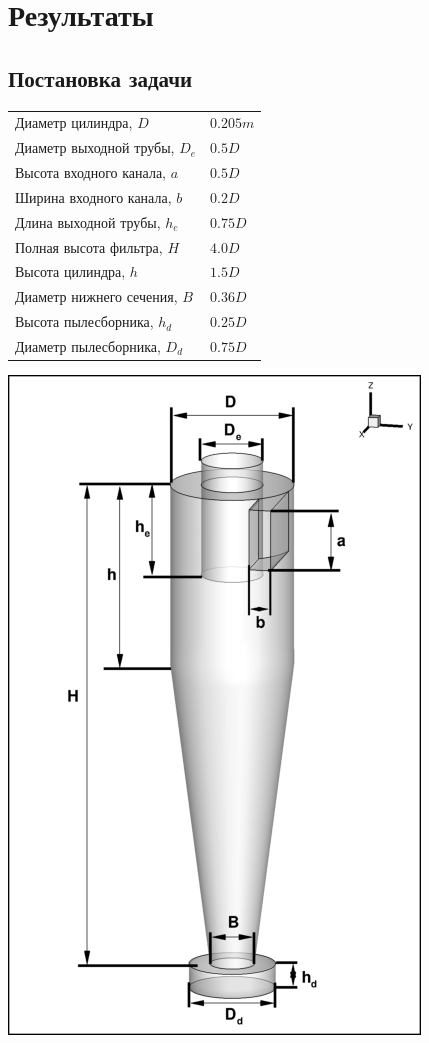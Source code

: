\section{Результаты}

\newpage
\subsection{Постановка задачи}
  \begin{minipage}{0.6\textwidth}
			\begin{tabular}{l l}
				\hline
				\label{geometrytable}
				Диаметр цилиндра, $D$ & $0.205m$ \\
				Диаметр выходной трубы, $D_e$ & $0.5D$ \\
				Высота входного канала, $a$ & $0.5D$ \\
				Ширина входного канала, $b$ & $0.2D$ \\
				Длина выходной трубы, $h_e$ & $0.75D$ \\
				Полная высота фильтра, $H$ & $4.0D$ \\
				Высота цилиндра, $h$ & $1.5D$ \\
				Диаметр нижнего сечения, $B$ & $0.36D$ \\
				Высота пылесборника, $h_d$ & $0.25D$ \\
				Диаметр пылесборника, $D_d$ & $0.75D$ \\
			\end{tabular}
    \end{minipage}
    \hspace{1em}
  \begin{minipage}{0.35\textwidth}
    \includegraphics[scale=0.375]{Geometry}
  \end{minipage}
